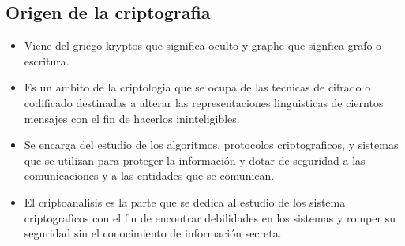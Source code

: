 \documentclass[11pt]{article}
\begin{document}
\subsection{Origen de la criptografia}
\label{sec:org2b5be85}
\begin{itemize}
\item Viene del griego kryptos que significa oculto y graphe que signfica grafo o escritura.
\item Es un ambito de la criptologia que se ocupa de las tecnicas de cifrado o codificado destinadas a alterar las representaciones linguisticas de cierntos mensajes con el fin de hacerlos ininteligibles.
\item Se encarga del estudio de los algoritmos, protocolos criptograficos, y sistemas que se utilizan para proteger la información y dotar de seguridad a las comunicaciones y a las entidades que se comunican.
\item El criptoanalisis es la parte que se dedica al estudio de los sistema criptograficos con el fin de encontrar debilidades en los sistemas y romper su seguridad sin el conocimiento de información secreta.
\end{itemize}
\end{document}
